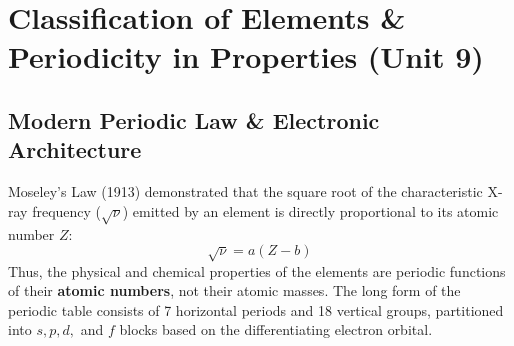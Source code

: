 \documentclass[10pt,a4paper]{article}
\begin{document}
\section{Classification of Elements \& Periodicity in Properties (Unit 9)}

\subsection{Modern Periodic Law \& Electronic Architecture}
Moseley's Law (1913) demonstrated that the square root of the characteristic X-ray frequency ($\sqrt{\nu}$) emitted by an element is directly proportional to its atomic number $Z$:
\begin{equation}
  \sqrt{\nu} = a(Z - b)
\end{equation}
Thus, the physical and chemical properties of the elements are periodic functions of their \textbf{atomic numbers}, not their atomic masses. The long form of the periodic table consists of 7 horizontal periods and 18 vertical groups, partitioned into $s, p, d,$ and $f$ blocks based on the differentiating electron orbital.
\end{document}
